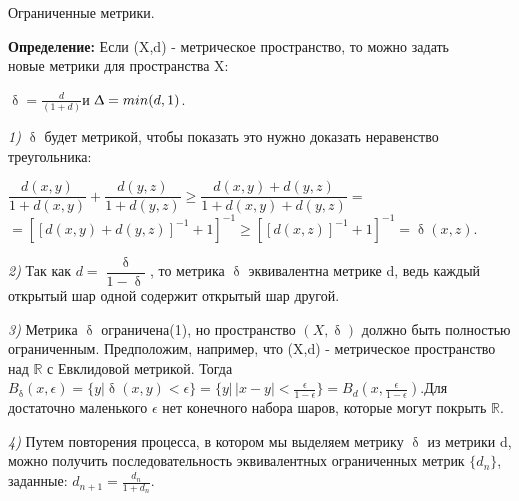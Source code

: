 \newpage
\begin{center} 
\huge Ограниченные метрики.\\ [10pt]
\vspace{\baselineskip}
\end{center} 
\textbf{Определение:} Если (X,d) - метрическое пространство, то можно задать \\новые метрики для пространства X: \\
\begin{center} 
$ \updelta = \frac{d}{(1+d)} $и $ \Updelta=min(d,1) $.
\end{center} 
\vspace{\baselineskip}
\par \textit{1)}  $\updelta$ будет метрикой, чтобы показать это нужно доказать неравенство треугольника:
\begin{center} 
$  \dfrac{d(x,y)}{1+d(x,y)}+\dfrac{d(y,z)}{1+d(y,z)} \geq \dfrac{d(x,y)+d(y,z)}{1+d(x,y)+d(y,z)} =$\\ 
\vspace{\baselineskip}
$=[[d(x,y)+d(y,z)]^{-1}+1]^{-1} \geq [[d(x,z)]^{-1}+1]^{-1}=\updelta(x,z).$
\end{center} 
\vspace{\baselineskip}

\par \textit{2)} Так как $d=\dfrac{\updelta}{1-\updelta}$, то метрика $\updelta$ эквивалентна метрике d, ведь каждый открытый шар одной содержит открытый шар другой.
\vspace{\baselineskip}

\par \textit{3)} Метрика $\updelta$  ограничена(1), но пространство $(X,\updelta)$ должно быть полностью ограниченным. Предположим, например, что  (X,d) - метрическое пространство  над $\mathds{R}$  с Евклидовой метрикой. Тогда $B_{\updelta}(x,\epsilon)=\{y| \updelta(x,y)<\epsilon \}=\{y|\,|x-y|<\frac{\epsilon}{1-\epsilon}\}=B_{d}(x,\frac{\epsilon}{1-\epsilon})$.Для достаточно маленького $\epsilon$ нет конечного набора шаров, которые могут покрыть $\mathds{R}$.
\vspace{\baselineskip}

\par \textit{4)} Путем повторения процесса, в котором мы выделяем метрику $\updelta$ из метрики d, можно получить последовательность эквивалентных ограниченных метрик $\{d_{n}\}$, заданные: $d_{n+1}=\frac{d_{n}}{1+d_{n}}$.
\vspace{\baselineskip}

